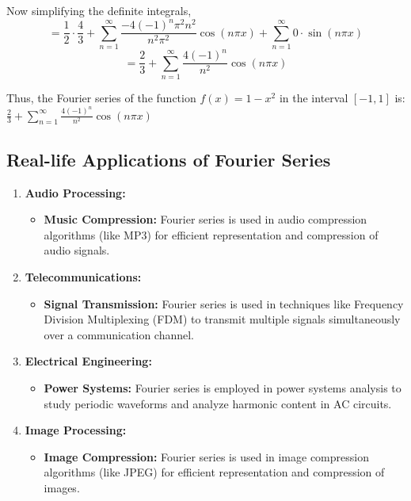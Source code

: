 \documentclass{MathematicaReport}
\begin{document}
Now simplifying the definite integrals,
\[ = \frac{1}{2} \cdot \frac{4}{3} + \sum_{n=1}^{\infty} \frac{-4(-1)^n\pi^2n^2}{n^2\pi^2} \cos(n\pi x) + \sum_{n=1}^{\infty} 0 \cdot \sin(n\pi x) \]
\[ = \frac{2}{3} + \sum_{n=1}^{\infty} \frac{4(-1)^n}{n^2} \cos(n\pi x) \]

Thus, the Fourier series of the function $f(x)=1-x^2$ in the interval 
$[-1,1]$ is: $\frac{2}{3} + \sum_{n=1}^{\infty} \frac{4(-1)^n}{n^2} \cos(n\pi x)$

\subsection{Real-life Applications of Fourier Series}

\begin{enumerate}[label=\arabic*.]
    \item \textbf{Audio Processing:}
    \begin{itemize}
        \item \textbf{Music Compression:} Fourier series is used in audio compression algorithms (like MP3) for efficient representation and compression of audio signals.
    \end{itemize}
    
    \item \textbf{Telecommunications:}
    \begin{itemize}
        \item \textbf{Signal Transmission:} Fourier series is used in techniques like Frequency Division Multiplexing (FDM) to transmit multiple signals simultaneously over a communication channel.
    \end{itemize}
    
    \item \textbf{Electrical Engineering:}
    \begin{itemize}
        \item \textbf{Power Systems:} Fourier series is employed in power systems analysis to study periodic waveforms and analyze harmonic content in AC circuits.
    \end{itemize}
    
    \item \textbf{Image Processing:}
    \begin{itemize}
        \item \textbf{Image Compression:} Fourier series is used in image compression algorithms (like JPEG) for efficient representation and compression of images.
    \end{itemize}
    

\end{enumerate}
\end{document}
